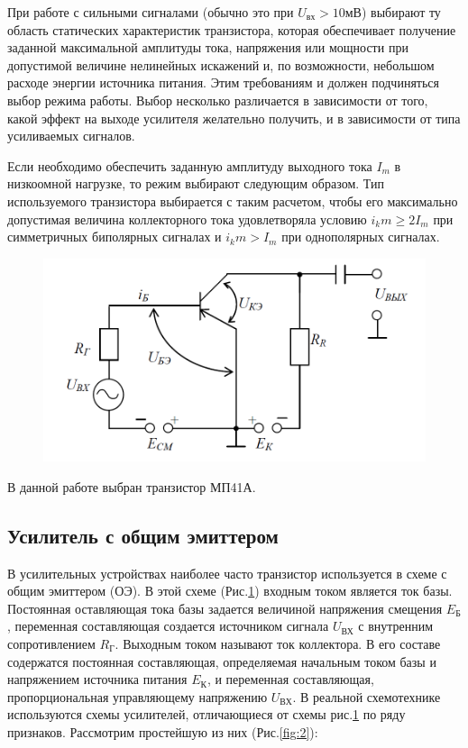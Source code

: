 При работе с сильными сигналами (обычно это при $U_{\text{вх}}>10$мВ) выбирают ту область статических характеристик транзистора, которая обеспечивает получение заданной максимальной амплитуды тока, напряжения или мощности при допустимой величине
нелинейных искажений и, по возможности, небольшом расходе энергии источника питания. Этим требованиям и должен подчиняться выбор режима работы. Выбор несколько различается в зависимости от того, какой эффект на выходе усилителя желательно получить, и в зависимости от типа усиливаемых сигналов.

Если необходимо обеспечить заданную амплитуду выходного тока $I_m$ в низкоомной нагрузке, то режим выбирают следующим образом. Тип используемого транзистора выбирается с таким расчетом, чтобы его максимально допустимая величина коллекторного тока удовлетворяла условию $i_km\geqslant 2I_m$ при симметричных биполярных сигналах и $i_km>I_m$ при однополярных сигналах.

\begin{figure}[h]
	\centering
	\includegraphics[width=0.5\linewidth]{fig/fig1}
	\caption{}
	\label{fig:1}
\end{figure}

В данной работе выбран транзистор МП41А.

\subsection{\textbf{Усилитель с общим эмиттером}}
В усилительных устройствах наиболее часто транзистор используется в схеме с общим эмиттером (ОЭ). В этой схеме (Рис.\ref{fig:1}) входным током является ток базы. Постоянная оставляющая тока базы задается величиной напряжения смещения $E_{\text{Б}}$, переменная составляющая создается источником сигнала $U_{\text{ВХ}}$ с внутренним сопротивлением $R_{\text{Г}}$. Выходным током называют ток коллектора. В его составе содержатся постоянная составляющая, определяемая начальным током базы и напряжением источника питания $E_{\text{К}}$, и переменная составляющая, пропорциональная управляющему напряжению $U_{\text{ВХ}}$. В реальной схемотехнике используются схемы усилителей, отличающиеся от схемы рис.\ref{fig:1} по ряду признаков. Рассмотрим простейшую из них (Рис.\ref{fig:2}):

